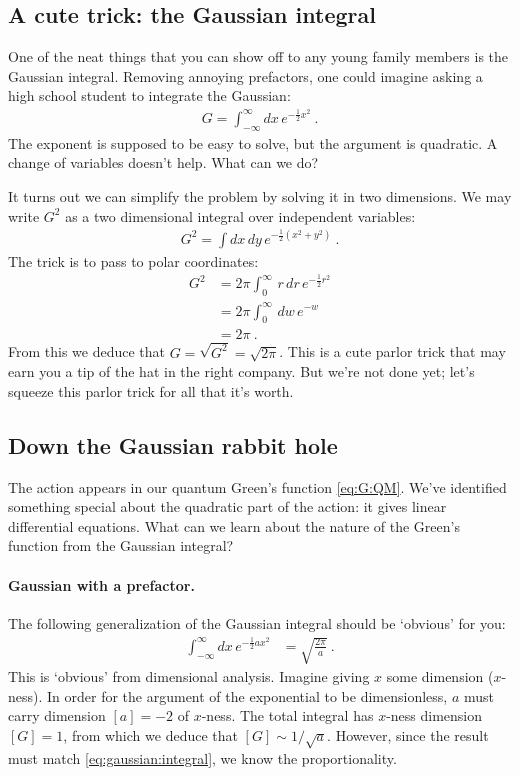 \subsection{A cute trick: the Gaussian integral}

One of the neat things that you can show off to any young family members is the Gaussian integral. Removing annoying prefactors, one could imagine asking a high school student to integrate the Gaussian:
\begin{align}
	G = \int_{-\infty}^\infty dx\, e^{-\frac{1}{2}x^2} \ .
\end{align}
The exponent is supposed to be easy to solve, but the argument is quadratic. A change of variables doesn't help. What can we do?

It turns out we can simplify the problem by solving it in two dimensions. We may write $G^2$ as a two dimensional integral over independent variables:
\begin{align}
	G^2 = \int dx\, dy\, e^{-\frac{1}{2}(x^2 + y^2)} \ .
\end{align}
The trick is to pass to polar coordinates:
\begin{align}
	G^2 &= 2\pi \int_0^\infty\, r\,dr\, e^{-\frac{1}{2}r^2}
	\\
	&= 2\pi \int_0^\infty\, dw\, e^{-w}
	\\
	&= 2\pi \ . \label{eq:gaussian:integral}
\end{align}
From this we deduce that $G = \sqrt{G^2} = \sqrt{2\pi}$. This is a cute parlor trick that may earn you a tip of the hat in the right company. But we're not done yet; let's squeeze this parlor trick for all that it's worth.

\subsection{Down the Gaussian rabbit hole}

The action appears in our quantum Green's function \eqref{eq:G:QM}. We've identified something special about the quadratic part of the action: it gives linear differential equations. What can we learn about the nature of the Green's function from the Gaussian integral?

\paragraph{Gaussian with a prefactor.} The following generalization of the Gaussian integral should be `obvious' for you:
\begin{align}
	\int_{-\infty}^{\infty}dx\, e^{-\frac{1}{2}ax^2}
	&=
	\sqrt{\frac{2\pi}{a}} \ .
	\label{eq:gaussian:a}
\end{align}
This is `obvious' from dimensional analysis. Imagine giving $x$ some dimension ($x$-ness). In order for the argument of the exponential to be dimensionless, $a$ must carry dimension $[a]=-2$ of $x$-ness. The total integral has $x$-ness dimension $[G]=1$, from which we deduce that $[G]\sim 1/\sqrt{a}$. However, since the result must match \eqref{eq:gaussian:integral}, we know the proportionality.

